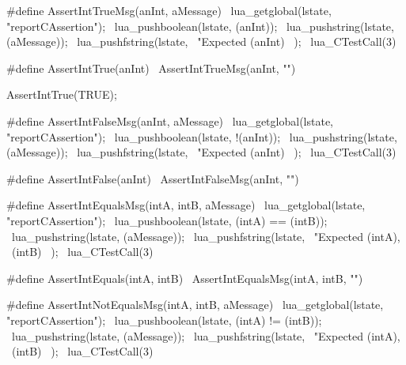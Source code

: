 \stopTestSuite

\startTestSuite[assertIntTrue]

\startCHeader
#define AssertIntTrueMsg(anInt, aMessage)    \
  lua_getglobal(lstate, "reportCAssertion"); \
  lua_pushboolean(lstate, (anInt));          \
  lua_pushstring(lstate, (aMessage));        \
  lua_pushfstring(lstate,                    \
      "Expected %
      (anInt)                                \
    );                                       \
  lua_CTestCall(3)

#define AssertIntTrue(anInt) \
  AssertIntTrueMsg(anInt, "")
\stopCHeader

\startTestCase[should succeed if true]
\startCTest
  AssertIntTrue(TRUE);
\stopCTest
\stopTestCase
\stopTestSuite

\startTestSuite[assertIntFalse]

\startCHeader
#define AssertIntFalseMsg(anInt, aMessage)   \
  lua_getglobal(lstate, "reportCAssertion"); \
  lua_pushboolean(lstate, !(anInt));         \
  lua_pushstring(lstate, (aMessage));        \
  lua_pushfstring(lstate,                    \
      "Expected %
      (anInt)                                \
    );                                       \
  lua_CTestCall(3)

#define AssertIntFalse(anInt) \
  AssertIntFalseMsg(anInt, "")
\stopCHeader

\stopTestSuite

\startTestSuite[assertIntEquals]

\startCHeader
#define AssertIntEqualsMsg(intA, intB, aMessage) \
  lua_getglobal(lstate, "reportCAssertion");     \
  lua_pushboolean(lstate, (intA) == (intB));     \
  lua_pushstring(lstate, (aMessage));            \
  lua_pushfstring(lstate,                        \
      "Expected %
      (intA),                                    \
      (intB)                                     \
    );                                           \
  lua_CTestCall(3)

#define AssertIntEquals(intA, intB) \
  AssertIntEqualsMsg(intA, intB, "")
\stopCHeader

\stopTestSuite

\startTestSuite[assertIntNotEquals]

\startCHeader
#define AssertIntNotEqualsMsg(intA, intB, aMessage) \
  lua_getglobal(lstate, "reportCAssertion");        \
  lua_pushboolean(lstate, (intA) != (intB));        \
  lua_pushstring(lstate, (aMessage));               \
  lua_pushfstring(lstate,                           \
      "Expected %
      (intA),                                       \
      (intB)                                        \
    );                                              \
  lua_CTestCall(3)

